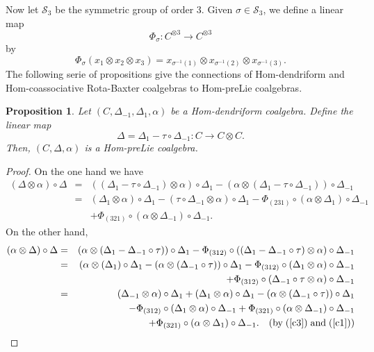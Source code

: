 \documentclass{article}
\newtheorem{prop}[thm]{Proposition}
\theoremstyle{definition}
\theoremstyle{remark}
\numberwithin{equation}{section}
\begin{document}
 Now let $\mathcal{S}_3$ be the symmetric group of order $3$. Given $\sigma\in\mathcal{S}_3$, we define a linear map 
 $$\Phi_\sigma : C^{\otimes3}\rightarrow C^{\otimes3}$$
 by
 $$\Phi_\sigma(x_1\otimes x_2\otimes x_3)=x_{\sigma^{-1}(1)}\otimes x_{\sigma^{-1}(2)}\otimes x_{\sigma^{-1}(3)}.$$
  The following serie of propositions give the connections of Hom-dendriform and Hom-coassociative Rota-Baxter coalgebras to
 Hom-preLie coalgebras.
 \begin{prop}
  Let $(C, \Delta_{-1}, \Delta_1, \alpha)$ be a Hom-dendriform coalgebra. Define the linear map
 $$\Delta=\Delta_1-\tau\circ\Delta_{-1} : C\rightarrow C\otimes C.$$
 Then, $(C, \Delta, \alpha)$ is a Hom-preLie coalgebra.
 \end{prop}
 \begin{proof}
 On the one hand we have
 \begin{eqnarray}
  (\Delta\otimes\alpha)\circ\Delta
  &=&((\Delta_1-\tau\circ\Delta_{-1})\otimes\alpha)\circ\Delta_1
 -(\alpha\otimes(\Delta_1-\tau\circ\Delta_{-1}))\circ\Delta_{-1}\nonumber\\
 &=&(\Delta_1\otimes\alpha)\circ\Delta_1-(\tau\circ\Delta_{-1}\otimes\alpha)\circ\Delta_1
 -\Phi_{(231)}\circ(\alpha\otimes\Delta_1)\circ\Delta_{-1}\nonumber\\
&&+\Phi_{(321)}\circ(\alpha\otimes\Delta_{-1})\circ\Delta_{-1}.\nonumber
 \end{eqnarray}
 On the other hand, 
 \begin{eqnarray}
  (\alpha\otimes\Delta)\circ\Delta
 &=&(\alpha\otimes(\Delta_1-\Delta_{-1}\circ\tau))\circ\Delta_1
 -\Phi_{(312)}\circ((\Delta_1-\Delta_{-1}\circ\tau)\otimes\alpha)\circ\Delta_{-1}\nonumber\\
 &=&(\alpha\otimes(\Delta_1)\circ\Delta_1-(\alpha\otimes(\Delta_{-1}\circ\tau))\circ\Delta_1
 -\Phi_{(312)}\circ(\Delta_1\otimes\alpha)\circ\Delta_{-1}\nonumber\\
&&+\Phi_{(312)}\circ(\Delta_{-1}\circ\tau\otimes\alpha)\circ\Delta_{-1}\nonumber\\
 &=&(\Delta_{-1}\otimes\alpha)\circ\Delta_{1}+(\Delta_{1}\otimes\alpha)\circ\Delta_{1}
 -(\alpha\otimes(\Delta_{-1}\circ\tau))\circ\Delta_1\nonumber\\
 &&-\Phi_{(312)}\circ(\Delta_1\otimes\alpha)\circ\Delta_{-1}+\Phi_{(321)}\circ(\alpha\otimes\Delta_{-1})\circ\Delta_{-1}\nonumber\\
 &&+\Phi_{(321)}\circ(\alpha\otimes\Delta_{1})\circ\Delta_{-1}.\quad(\mbox{by}\;(\ref{c3})\;\mbox{and}\;(\ref{c1}))\nonumber
 \end{eqnarray}

\end{proof}
\end{document}
